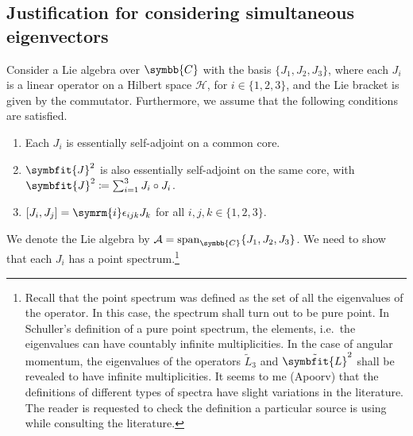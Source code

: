 \documentclass[12pt, a4 paper]{article}
\let\symcal\mathcal
\theoremstyle{definition}
\newcommand{\cc}{\symbb{C}}
\newcommand{\hilbert}{\symcal{H}}
\renewcommand{\i}{\symrm{i}}
\newcommand{\lvecsquare}{\tilde{\symbfit{L}}^2}
\DeclareMathOperator{\spann}{span}
\begin{document}
    \subsection{Justification for considering simultaneous eigenvectors}

    Consider a Lie algebra over \(\cc\) with the basis \(\{J_1, J_2, J_3\}\), where each \(J_i\) is a linear operator on a Hilbert space \(\hilbert\), for \(i \in \{1, 2, 3\}\), and the Lie bracket is given by the commutator. Furthermore, we assume that the following conditions are satisfied.
    \begin{enumerate}
        \item Each \(J_i\) is essentially self-adjoint on a common core.
        \item \(\symbfit{J}^2\) is also essentially self-adjoint on the same core, with \(\symbfit{J}^2 \coloneq \sum_{i=1}^3 J_i \circ J_i\).
        \item \([J_i, J_j] = \i \epsilon_{ijk} J_k\) for all \(i, j, k \in \{1, 2, 3\}\).
    \end{enumerate}
    We denote the Lie algebra by \(\symcal{A} = \spann_{\cc}\{J_1, J_2, J_3\}\). We need to show that each \(J_i\) has a point spectrum.\footnote{Recall that the point spectrum was defined as the set of all the eigenvalues of the operator. In this case, the spectrum shall turn out to be pure point. In Schuller's definition of a pure point spectrum, the elements, i.e.\ the eigenvalues can have countably infinite multiplicities. In the case of angular momentum, the eigenvalues of the operators \(\tilde{L}_3\) and \(\lvecsquare\) shall be revealed to have infinite multiplicities. It seems to me (Apoorv) that the definitions of different types of spectra have slight variations in the literature. The reader is requested to check the definition a particular source is using while consulting the literature.}
\end{document}
